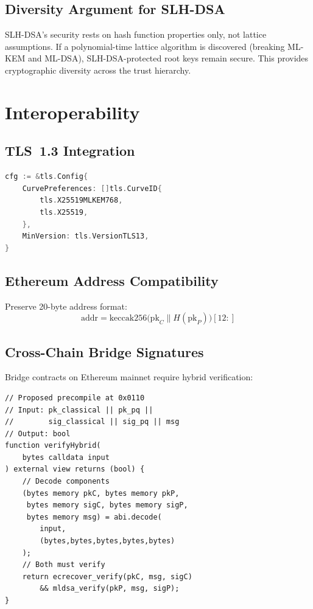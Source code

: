 \documentclass[11pt,a4paper]{article}
\begin{document}
\subsection{Diversity Argument for SLH-DSA}

SLH-DSA's security rests on hash function properties only, not lattice
assumptions.  If a polynomial-time lattice algorithm is discovered
(breaking ML-KEM and ML-DSA), SLH-DSA-protected root keys remain secure.
This provides cryptographic diversity across the trust hierarchy.

\section{Interoperability}
\label{sec:interop}

\subsection{TLS~1.3 Integration}

\begin{lstlisting}[language=Go,caption={Hybrid TLS Configuration}]
cfg := &tls.Config{
    CurvePreferences: []tls.CurveID{
        tls.X25519MLKEM768,
        tls.X25519,
    },
    MinVersion: tls.VersionTLS13,
}
\end{lstlisting}

\subsection{Ethereum Address Compatibility}

Preserve 20-byte address format:
\[
    \mathrm{addr} = \mathrm{keccak256}\bigl(
        \mathrm{pk}_C \| H(\mathrm{pk}_P)
    \bigr)[12:]
\]

\subsection{Cross-Chain Bridge Signatures}

Bridge contracts on Ethereum mainnet require hybrid verification:

\begin{lstlisting}[language=Solidity,caption={Hybrid Verification Precompile}]
// Proposed precompile at 0x0110
// Input: pk_classical || pk_pq ||
//        sig_classical || sig_pq || msg
// Output: bool
function verifyHybrid(
    bytes calldata input
) external view returns (bool) {
    // Decode components
    (bytes memory pkC, bytes memory pkP,
     bytes memory sigC, bytes memory sigP,
     bytes memory msg) = abi.decode(
        input,
        (bytes,bytes,bytes,bytes,bytes)
    );
    // Both must verify
    return ecrecover_verify(pkC, msg, sigC)
        && mldsa_verify(pkP, msg, sigP);
}
\end{lstlisting}
\end{document}

